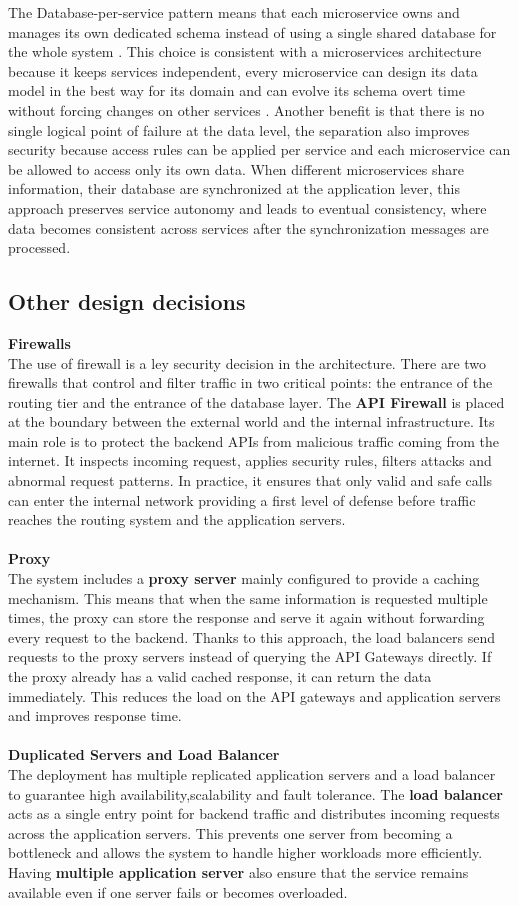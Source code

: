 The Database-per-service pattern means that each microservice owns and manages its own dedicated schema instead of using a single shared database for the whole system . This choice is consistent with a microservices architecture because it keeps services independent, every microservice can design its data model in the best way for its domain and can evolve its schema overt time without forcing changes on other services . Another benefit is that there is no single logical point of failure at the data level, the separation also improves security because access rules can be applied per service and each microservice can be allowed to access only its own data.
When different microservices share information, their database are synchronized at the application lever, this approach preserves service autonomy and leads to eventual consistency, where data becomes consistent across services after the synchronization messages are processed.
\subsection{Other design decisions}
\textbf{Firewalls} \\
The use of firewall is a ley security decision in the architecture. There are two firewalls that control and filter traffic in two critical points: the entrance of the routing tier and the entrance of the database layer.
The \textbf{API Firewall } is placed at the boundary between the external world and the internal infrastructure. Its main role is to protect the backend APIs from malicious traffic coming from the internet. It inspects incoming request, applies security rules, filters attacks and abnormal request patterns. 
In practice, it ensures that only valid and safe calls can enter the internal network providing a first level of defense before traffic reaches the routing system and the application servers.
\\
\\
\textbf{Proxy}\\
The system includes a \textbf{proxy server} mainly configured to provide a caching mechanism. This means that when the same information is requested multiple times, the proxy can store the response and serve it again without forwarding every request to the backend.
Thanks to this approach, the load balancers send requests to the proxy servers instead of querying the API Gateways directly. If the proxy already has a valid cached response, it can return the data immediately. This reduces the load on the API gateways and application servers and improves response time.
\\
\\
\textbf{Duplicated Servers and Load Balancer}\\
The deployment has multiple replicated application servers and a load balancer to guarantee high availability,scalability and fault tolerance. 
The \textbf{load balancer}  acts as a single entry point for backend traffic and distributes incoming requests across the application servers. This prevents one server from becoming a  bottleneck and allows the system to handle higher workloads more efficiently. 
Having \textbf{multiple application server} also ensure that the service remains available even if one server fails or becomes overloaded.